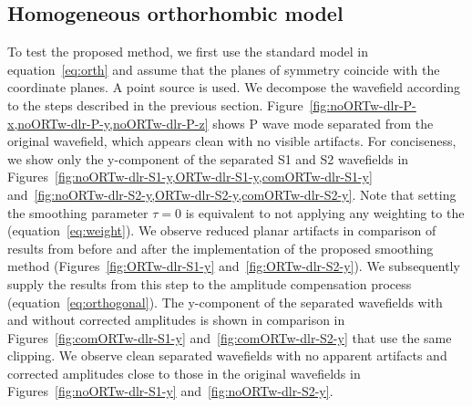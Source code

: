 \subsection{Homogeneous orthorhombic model}
To test the proposed method, we first use the standard model in equation~\ref{eq:orth} \cite[]{helbig} and assume that the planes of symmetry coincide with the coordinate planes. A point  source  is used.  We decompose the wavefield according to the steps described in the previous section. Figure~\ref{fig:noORTw-dlr-P-x,noORTw-dlr-P-y,noORTw-dlr-P-z} shows P wave mode separated from the original wavefield, which appears clean with no visible artifacts. For conciseness, we show only the y-component of the separated S1 and S2 wavefields in Figures~\ref{fig:noORTw-dlr-S1-y,ORTw-dlr-S1-y,comORTw-dlr-S1-y} and~\ref{fig:noORTw-dlr-S2-y,ORTw-dlr-S2-y,comORTw-dlr-S2-y}. Note that setting the smoothing parameter $\tau=0$ is equivalent to not applying any weighting to the  (equation~\ref{eq:weight}). We observe reduced planar artifacts in comparison of results from before and after the implementation of the proposed smoothing method (Figures~\ref{fig:ORTw-dlr-S1-y} and~\ref{fig:ORTw-dlr-S2-y}).
We subsequently supply the results from this step to the amplitude compensation process (equation~\ref{eq:orthogonal}). The y-component of the separated wavefields with and without corrected amplitudes is shown in comparison in Figures~\ref{fig:comORTw-dlr-S1-y} and~\ref{fig:comORTw-dlr-S2-y} that use the same clipping. We observe clean separated wavefields with no apparent artifacts and corrected amplitudes close to those in the original wavefields in Figures~\ref{fig:noORTw-dlr-S1-y} and~\ref{fig:noORTw-dlr-S2-y}.


